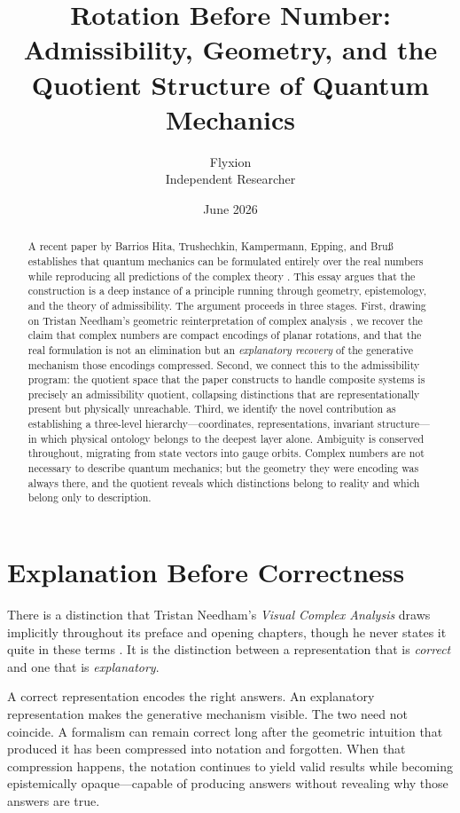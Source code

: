 \documentclass[12pt]{article}
\title{Rotation Before Number:\\
Admissibility, Geometry, and the Quotient Structure of Quantum Mechanics}
\author{Flyxion\\
\small Independent Researcher}
\date{June 2026}
\begin{document}
\maketitle

\begin{abstract}
A recent paper by Barrios Hita, Trushechkin, Kampermann, Epping, and Bru{\ss} establishes that quantum mechanics can be formulated entirely over the real numbers while reproducing all predictions of the complex theory \cite{Barrios}. This essay argues that the construction is a deep instance of a principle running through geometry, epistemology, and the theory of admissibility. The argument proceeds in three stages. First, drawing on Tristan Needham's geometric reinterpretation of complex analysis \cite{Needham}, we recover the claim that complex numbers are compact encodings of planar rotations, and that the real formulation is not an elimination but an \emph{explanatory recovery} of the generative mechanism those encodings compressed. Second, we connect this to the admissibility program: the quotient space that the paper constructs to handle composite systems is precisely an admissibility quotient, collapsing distinctions that are representationally present but physically unreachable. Third, we identify the novel contribution as establishing a three-level hierarchy---coordinates, representations, invariant structure---in which physical ontology belongs to the deepest layer alone. Ambiguity is conserved throughout, migrating from state vectors into gauge orbits. Complex numbers are not necessary to describe quantum mechanics; but the geometry they were encoding was always there, and the quotient reveals which distinctions belong to reality and which belong only to description.
\end{abstract}

\section{Explanation Before Correctness}

There is a distinction that Tristan Needham's \emph{Visual Complex Analysis} draws implicitly throughout its preface and opening chapters, though he never states it quite in these terms \cite{Needham}. It is the distinction between a representation that is \emph{correct} and one that is \emph{explanatory}.

A correct representation encodes the right answers. An explanatory representation makes the generative mechanism visible. The two need not coincide. A formalism can remain correct long after the geometric intuition that produced it has been compressed into notation and forgotten. When that compression happens, the notation continues to yield valid results while becoming epistemically opaque---capable of producing answers without revealing why those answers are true.
\end{document}
